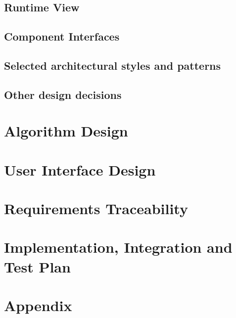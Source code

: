 \documentclass{article}
\begin{document}
\subsection{Runtime View}\label{runtimeview}


\clearpage


\clearpage


\clearpage


\clearpage


\clearpage

\subsection{Component Interfaces}\label{componentinterfaces}

\subsection{Selected architectural styles and patterns}\label{archstyles}


\subsection{Other design decisions}\label{otherdecisions}

\clearpage
\section{Algorithm Design}



\section{User Interface Design}


\clearpage
\section{Requirements Traceability}

\clearpage
\section{Implementation, Integration and Test Plan}



\clearpage
\section{Appendix}
\end{document}
